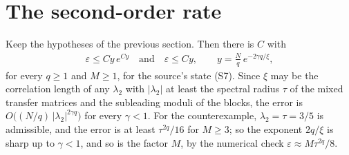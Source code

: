 \documentclass{article}
\begin{document}
\section{The second-order rate}
Keep the hypotheses of the previous section.
Then there is $C$ with
\begin{align}
    \varepsilon\leq Cy\,e^{Cy}\quad\text{and}\quad\varepsilon\leq Cy,\qquad
    y=\frac Nq\,e^{-2\gamma q/\xi},
    \label{eq:mswc24_mixed_second_order}
\end{align}
for every $q\geq1$ and $M\geq1$, for the source's state (S7). Since $\xi$ may be the correlation
length of any $\lambda_2$ with $\lvert\lambda_2\rvert$ at least the spectral radius $\tau$ of the
mixed transfer matrices and the subleading moduli of the blocks, the error is
$O\bigl((N/q)\,\lvert\lambda_2\rvert^{2\gamma q}\bigr)$ for every $\gamma<1$. For the counterexample,
$\lambda_2=\tau=3/5$ is admissible, and the error is at least $\tau^{2q}/16$ for $M\geq3$; so the
exponent $2q/\xi$ is sharp up to $\gamma<1$, and so is the factor $M$, by the numerical check
$\varepsilon\approx M\tau^{2q}/8$.
\end{document}
